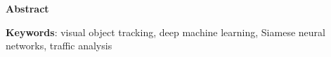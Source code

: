\thispagestyle{plain}

\begin{center}
    \Large{\textbf{Abstract}}
\end{center}


\noindent \textbf{Keywords}: visual object tracking, deep machine learning, Siamese neural networks, traffic analysis
